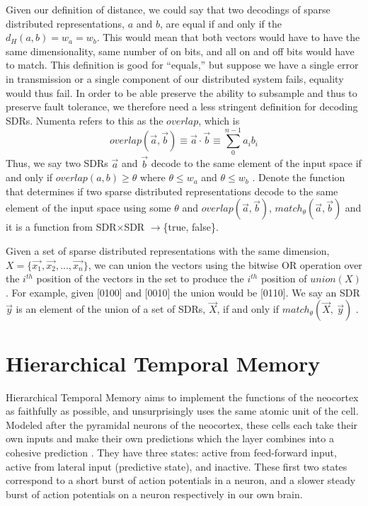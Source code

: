 \documentclass[oneside,12pt,openany]{book}
\begin{document}
	Given our definition of distance, we could say that two decodings of sparse distributed representations, $a$ and $b$, are equal if and only if the $d_{H}(a,b) = w_{a} = w_{b}$. This would mean that both vectors would have to have the same dimensionality, same number of on bits, and all on and off bits would have to match. This definition is good for ``equals,'' but suppose we have a single error in transmission or a single component of our distributed system fails, equality would thus fail. In order to be able preserve the ability to subsample and thus to preserve fault tolerance, we therefore need a less stringent definition for decoding SDRs. Numenta refers to this as the $overlap$, which is $$ overlap(\overrightarrow{a}, \overrightarrow{b}) \equiv \overrightarrow{a} \cdot \overrightarrow{b} \equiv \sum_{0}^{n-1} a_{i}b_{i}$$ Thus, we say two SDRs $\overrightarrow{a}$ and $\overrightarrow{b}$ decode to the same element of the input space if and only if $overlap(a,b) \geq \theta$ where $\theta \leq w_{a}$ and $\theta \leq w_{b}$ \cite{Properties}. Denote the function that determines if two sparse distributed representations decode to the same element of the input space using some $\theta$ and $overlap(\overrightarrow{a}, \overrightarrow{b})$, $match_{\theta}(\overrightarrow{a}, \overrightarrow{b})$ and it is a function from SDR$\times$SDR $\longrightarrow$\{true, false\}.
	
	Given a set of sparse distributed representations with the same dimension, $X =\{\overrightarrow{x_{1}}, \overrightarrow{x_{2}}, ...,\overrightarrow{x_{n}}\}$, we can union the vectors using the bitwise OR operation over the $i^{th}$ position of the vectors in the set to produce the $i^{th}$ position of $union(X)$ \cite{Properties}. For example, given [0100] and [0010] the union would be [0110]. We say an SDR $\overrightarrow{y}$ is an element of the union of a set of SDRs, $\overrightarrow{X}$, if and only if $match_{\theta}(\overrightarrow{X},\ \overrightarrow{y})$ \cite{Properties}.
	
	\section{Hierarchical Temporal Memory}
	
	Hierarchical Temporal Memory aims to implement the functions of the neocortex as faithfully as possible, and unsurprisingly uses the same atomic unit of the cell. Modeled after the pyramidal neurons of the neocortex, these cells each take their own inputs and make their own predictions which the layer combines into a cohesive prediction \cite{Whitepaper}. They have three states: active from feed-forward input, active from lateral input (predictive state), and inactive. These first two states correspond to a short burst of action potentials in a neuron, and a slower steady burst of action potentials on a neuron respectively in our own brain.
	
\end{document}
